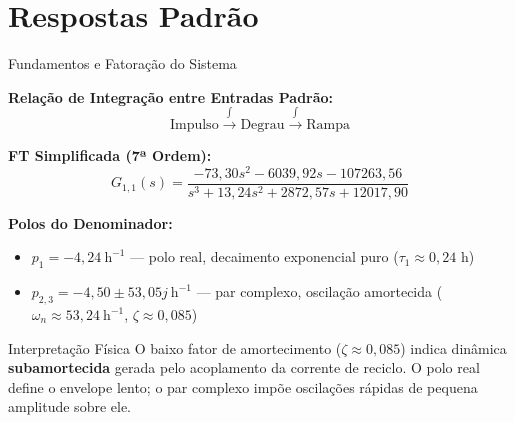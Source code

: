\section{Respostas Padrão}

\begin{frame}{Fundamentos e Fatoração do Sistema}
  \footnotesize

  \textbf{Relação de Integração entre Entradas Padrão:}
  \begin{equation*}
    \text{Impulso}
    \xrightarrow{\int}
    \text{Degrau}
    \xrightarrow{\int}
    \text{Rampa}
  \end{equation*}

  \textbf{FT Simplificada (7ª Ordem):}
  \begin{equation*}
    G_{1,1}(s) = \frac{-73{,}30s^2 - 6039{,}92s - 107263{,}56}
    {s^3 + 13{,}24s^2 + 2872{,}57s + 12017{,}90}
  \end{equation*}

  \textbf{Polos do Denominador:}
\begin{itemize}\itemsep2pt
    \item $p_1 = -4{,}24~\text{h}^{-1}$ — polo real, decaimento exponencial puro
      ($\tau_1 \approx 0{,}24$ h)
    \item $p_{2,3} = -4{,}50 \pm 53{,}05j~\text{h}^{-1}$ — par complexo,
      oscilação amortecida ($\omega_n \approx 53{,}24~\text{h}^{-1}$,
      $\zeta \approx 0{,}085$)
  \end{itemize}

  \begin{block}{Interpretação Física}
    O baixo fator de amortecimento ($\zeta \approx 0{,}085$) indica dinâmica
    \textbf{subamortecida} gerada pelo acoplamento da corrente de reciclo.
    O polo real define o envelope lento; o par complexo impõe oscilações
    rápidas de pequena amplitude sobre ele.
  \end{block}

\end{frame}


